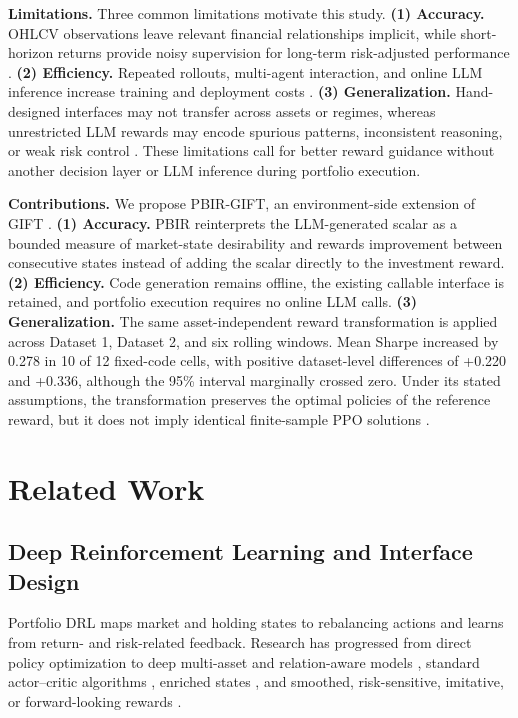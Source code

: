 \documentclass[pdflatex,sn-basic,Numbered]{sn-jnl}
\begin{document}
\textbf{Limitations.} Three common limitations motivate this study. \textbf{(1) Accuracy.} OHLCV observations leave relevant financial relationships implicit, while short-horizon returns provide noisy supervision for long-term risk-adjusted performance \cite{ref13,ref14}. \textbf{(2) Efficiency.} Repeated rollouts, multi-agent interaction, and online LLM inference increase training and deployment costs \cite{ref17,ref18,ref19}. \textbf{(3) Generalization.} Hand-designed interfaces may not transfer across assets or regimes, whereas unrestricted LLM rewards may encode spurious patterns, inconsistent reasoning, or weak risk control \cite{ref21,ref22,ref23,ref24}. These limitations call for better reward guidance without another decision layer or LLM inference during portfolio execution.

\textbf{Contributions.} We propose PBIR-GIFT, an environment-side extension of GIFT \cite{ref29}. \textbf{(1) Accuracy.} PBIR reinterprets the LLM-generated scalar as a bounded measure of market-state desirability and rewards improvement between consecutive states instead of adding the scalar directly to the investment reward. \textbf{(2) Efficiency.} Code generation remains offline, the existing callable interface is retained, and portfolio execution requires no online LLM calls. \textbf{(3) Generalization.} The same asset-independent reward transformation is applied across Dataset 1, Dataset 2, and six rolling windows. Mean Sharpe increased by 0.278 in 10 of 12 fixed-code cells, with positive dataset-level differences of +0.220 and +0.336, although the 95\% interval marginally crossed zero. Under its stated assumptions, the transformation preserves the optimal policies of the reference reward, but it does not imply identical finite-sample PPO solutions \cite{ref30}.

\hypertarget{related-work}{%
\section{Related Work}\label{related-work}}

\hypertarget{deep-reinforcement-learning-and-interface-design}{%
\subsection{Deep Reinforcement Learning and Interface Design}\label{deep-reinforcement-learning-and-interface-design}}

Portfolio DRL maps market and holding states to rebalancing actions and learns from return- and risk-related feedback. Research has progressed from direct policy optimization \cite{ref1} to deep multi-asset and relation-aware models \cite{ref2,ref3,ref4}, standard actor--critic algorithms \cite{ref7,ref8,ref9,ref10}, enriched states \cite{ref11,ref12,ref13}, and smoothed, risk-sensitive, imitative, or forward-looking rewards \cite{ref12,ref14,ref15,ref16}.
\end{document}
